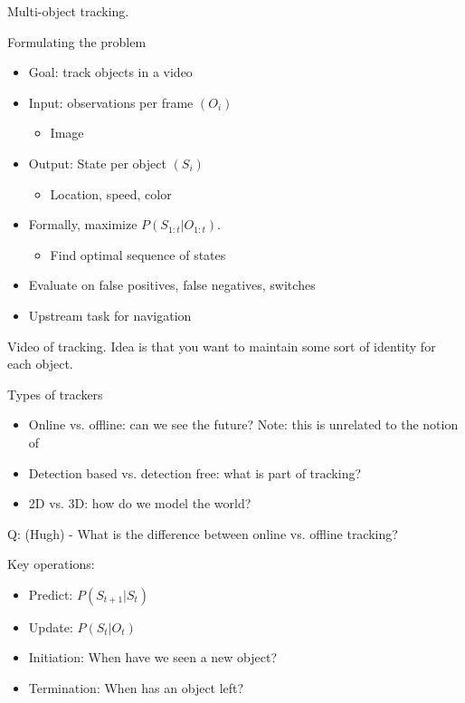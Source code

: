 \documentclass{article}
\begin{document}
Multi-object tracking.

Formulating the problem

\begin{itemize}
  \item Goal: track objects in a video
  \item Input: observations per frame $(O_i)$
    \begin{itemize}
      \item Image
    \end{itemize}
  \item Output: State per object $(S_i)$
    \begin{itemize}
      \item Location, speed, color
    \end{itemize}
  \item Formally, maximize $P(S_{1:t} | O_{1:t})$.
    \begin{itemize}
      \item Find optimal sequence of states
    \end{itemize}
  \item Evaluate on false positives, false negatives, switches
  \item Upstream task for navigation
\end{itemize}

Video of tracking.  Idea is that you want to maintain some sort of identity for each object.

Types of trackers
\begin{itemize}
  \item Online vs. offline: can we see the future?  Note: this is unrelated to the notion of 
  \item Detection based vs. detection free: what is part of tracking?
  \item 2D vs. 3D: how do we model the world?
\end{itemize}

Q: (Hugh) - What is the difference between online vs. offline tracking?

Key operations:

\begin{itemize}
  \item Predict: $P(S_{t+1} | S_t)$
  \item Update: $P(S_t | O_t)$
  \item Initiation: When have we seen a new object?
  \item Termination: When has an object left?
\end{itemize}
\end{document}
